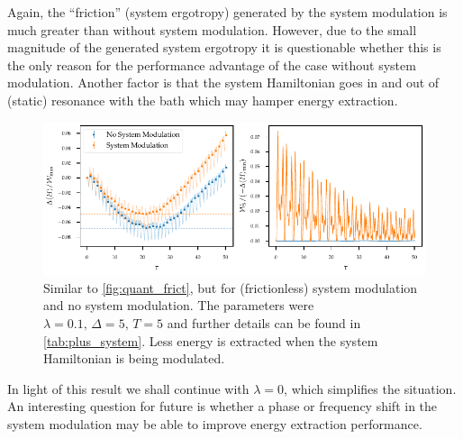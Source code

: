Again, the ``friction'' (system ergotropy) generated by the system
modulation is much greater than without system modulation. However,
due to the small magnitude of the generated system ergotropy it is
questionable whether this is the only reason for the performance
advantage of the case without system modulation. Another factor is
that the system Hamiltonian goes in and out of (static) resonance with
the bath which may hamper energy extraction.
\begin{figure}[htp]
  \centering
  \includegraphics{figs/one_bath_mod/system_vs_no_system}
  \caption{\label{fig:quant_frict_sys_no_sys} Similar to
    \cref{fig:quant_frict}, but for (frictionless) system modulation
    and no system modulation. The parameters were
    \(λ=0.1,\, Δ=5,\, T=5\) and further details can be found in
    \cref{tab:plus_system}. Less energy is extracted when the system
    Hamiltonian is being modulated.}
\end{figure}

In light of this result we shall continue with \(λ=0\), which
simplifies the situation. An interesting question for future is
whether a phase or frequency shift in the system modulation may be
able to improve energy extraction performance.

